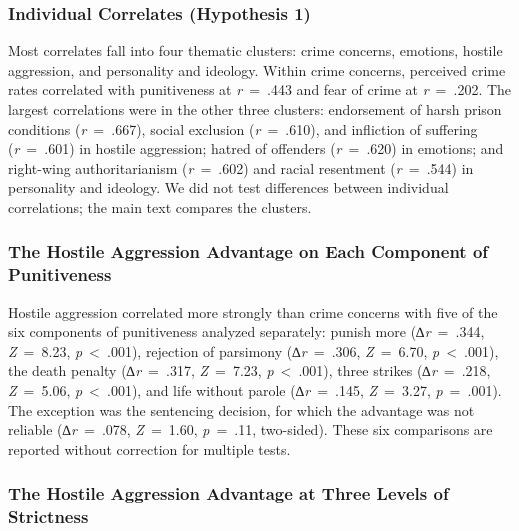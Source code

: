 \subsubsection{Individual Correlates (Hypothesis 1)}\label{individual-correlates-hypothesis-1}

Most correlates fall into four thematic clusters: crime concerns, emotions, hostile aggression, and personality and ideology. Within crime concerns, perceived crime rates correlated with punitiveness at \emph{r}~=~.443 and fear of crime at \emph{r}~=~.202. The largest correlations were in the other three clusters: endorsement of harsh prison conditions (\emph{r}~=~.667), social exclusion (\emph{r}~=~.610), and infliction of suffering (\emph{r}~=~.601) in hostile aggression; hatred of offenders (\emph{r}~=~.620) in emotions; and right-wing authoritarianism (\emph{r}~=~.602) and racial resentment (\emph{r}~=~.544) in personality and ideology. We did not test differences between individual correlations; the main text compares the clusters.

\subsubsection{The Hostile Aggression Advantage on Each Component of Punitiveness}\label{the-hostile-aggression-advantage-on-each-component-of-punitiveness}

Hostile aggression correlated more strongly than crime concerns with five of the six components of punitiveness analyzed separately: punish more (∆\emph{r}~=~.344, \emph{Z}~=~8.23, \emph{p}~\textless{}~.001), rejection of parsimony (∆\emph{r}~=~.306, \emph{Z}~=~6.70, \emph{p}~\textless{}~.001), the death penalty (∆\emph{r}~=~.317, \emph{Z}~=~7.23, \emph{p}~\textless{}~.001), three strikes (∆\emph{r}~=~.218, \emph{Z}~=~5.06, \emph{p}~\textless{}~.001), and life without parole (∆\emph{r}~=~.145, \emph{Z}~=~3.27, \emph{p}~=~.001). The exception was the sentencing decision, for which the advantage was not reliable (∆\emph{r}~=~.078, \emph{Z}~=~1.60, \emph{p}~=~.11, two-sided). These six comparisons are reported without correction for multiple tests.

\subsubsection{The Hostile Aggression Advantage at Three Levels of Strictness}\label{the-hostile-aggression-advantage-at-three-levels-of-strictness}

